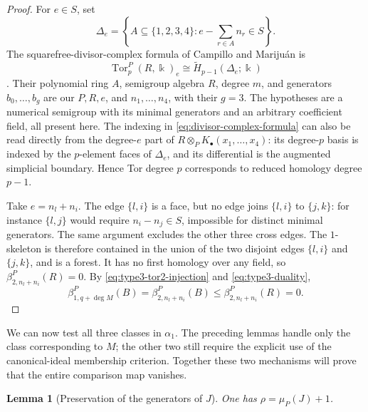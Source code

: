 \documentclass[10pt]{amsart}
\theoremstyle{plain}
\newtheorem{lemma}{Lemma}[section]
\begin{document}
\begin{proof}
For \(e\in S\), set
\[
\Delta_e=\left\{A\subseteq\{1,2,3,4\}:
 e-\sum_{r\in A}n_r\in S\right\}.
\]
The squarefree-divisor-complex formula of Campillo and Mariju\'an is
\begin{equation}\label{eq:divisor-complex-formula}
\operatorname{Tor}_p^P(R,\Bbbk)_e
 \cong\widetilde H_{p-1}(\Delta_e;\Bbbk)
\end{equation}
\cite[Lemma~1.1 and Theorem~1.2]{CM91}.  Their polynomial ring \(A\),
semigroup algebra \(R\), degree \(m\), and generators \(b_0,\ldots,b_g\)
are our \(P,R,e\), and \(n_1,\ldots,n_4\), with their \(g=3\).
The hypotheses are a numerical semigroup with its minimal generators
and an arbitrary coefficient field, all present here.  The indexing
in \eqref{eq:divisor-complex-formula} can also be read directly from
the degree-\(e\) part of \(R\otimes_P K_\bullet(x_1,\ldots,x_4)\):
its degree-\(p\) basis is indexed by the \(p\)-element faces of
\(\Delta_e\), and its differential is the augmented simplicial
boundary.  Hence Tor degree \(p\) corresponds to reduced homology
degree \(p-1\).

Take \(e=n_l+n_i\).  The edge \(\{l,i\}\) is a face, but no edge
joins \(\{l,i\}\) to \(\{j,k\}\): for instance \(\{l,j\}\) would
require \(n_i-n_j\in S\), impossible for distinct minimal generators.
The same argument excludes the other three cross edges.  The
\(1\)-skeleton is therefore contained in the union of the two disjoint
edges \(\{l,i\}\) and \(\{j,k\}\), and is a forest.  It has no
first homology over any field, so \(\beta_{2,n_l+n_i}^P(R)=0\).
By \eqref{eq:type3-tor2-injection} and \eqref{eq:type3-duality},
\[
\beta_{1,q+\deg M}^P(B)
 =\beta_{2,n_l+n_i}^P(B)
 \le\beta_{2,n_l+n_i}^P(R)=0.
\]
\end{proof}

We can now test all three classes in \(\alpha_1\).  The preceding
lemmas handle only the class corresponding to \(M\); the other two
still require the explicit use of the canonical-ideal membership
criterion.  Together these two mechanisms will prove that the entire
comparison map vanishes.

\begin{lemma}[Preservation of the generators of \(J\)]
\label{lem:type3-comparison}
One has \(\rho=\mu_P(J)+1\).
\end{lemma}
\end{document}
